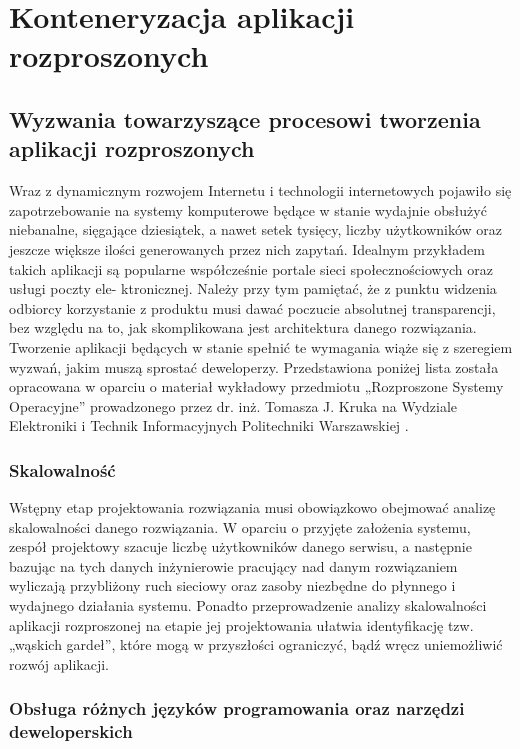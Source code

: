 \chapter{Konteneryzacja aplikacji rozproszonych}

\section{Wyzwania towarzyszące procesowi tworzenia aplikacji rozproszonych}

Wraz z dynamicznym rozwojem Internetu i technologii internetowych pojawiło się zapotrzebowanie na systemy komputerowe będące w stanie wydajnie obsłużyć niebanalne, sięgające dziesiątek, a nawet setek tysięcy, liczby użytkowników oraz jeszcze większe ilości generowanych przez nich zapytań. Idealnym przykładem takich aplikacji są popularne współcześnie portale sieci społecznościowych oraz usługi poczty ele- ktronicznej. Należy przy tym pamiętać, że z punktu widzenia odbiorcy korzystanie z produktu musi dawać poczucie absolutnej transparencji, bez względu na to, jak skomplikowana jest architektura danego rozwiązania. Tworzenie aplikacji będących w stanie spełnić te wymagania wiąże się z szeregiem wyzwań, jakim muszą sprostać deweloperzy. Przedstawiona poniżej lista została opracowana w oparciu o materiał wykładowy przedmiotu „Rozproszone Systemy Operacyjne” prowadzonego przez dr. inż. Tomasza J. Kruka na Wydziale Elektroniki i Technik Informacyjnych Politechniki Warszawskiej \cite{RSO}.

\subsection{Skalowalność}

Wstępny etap projektowania rozwiązania musi obowiązkowo obejmować analizę skalowalności danego rozwiązania. W oparciu o przyjęte założenia systemu, zespół projektowy szacuje liczbę użytkowników danego serwisu, a następnie bazując na tych danych inżynierowie pracujący nad danym rozwiązaniem wyliczają przybliżony ruch sieciowy oraz zasoby niezbędne do płynnego i wydajnego działania systemu. Ponadto przeprowadzenie analizy skalowalności aplikacji rozproszonej na etapie jej projektowania ułatwia identyfikację tzw. „wąskich gardeł”, które mogą w przyszłości ograniczyć, bądź wręcz uniemożliwić rozwój aplikacji.

\subsection{Obsługa różnych języków programowania oraz narzędzi deweloperskich}

